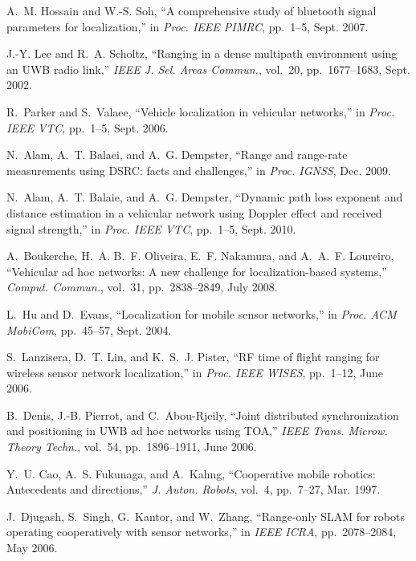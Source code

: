 \documentclass[12pt,journal,final,onecolumn]{IEEEtran}
\theoremstyle{definition}
\theoremstyle{myremark}
\begin{document}
\begin{thebibliography}{10}
A.~M. Hossain and W.-S. Soh, ``A comprehensive study of bluetooth signal
  parameters for localization,'' in {\em Proc. IEEE PIMRC}, pp.~1--5, Sept.
  2007.

J.-Y. Lee and R.~A. Scholtz, ``Ranging in a dense multipath environment using
  an {UWB} radio link,'' {\em IEEE J. Sel. Areas Commun.}, vol.~20,
  pp.~1677--1683, Sept. 2002.

R.~Parker and S.~Valaee, ``Vehicle localization in vehicular networks,'' in
  {\em Proc. IEEE VTC}, pp.~1--5, Sept. 2006.

N.~Alam, A.~T. Balaei, and A.~G. Dempster, ``Range and range-rate measurements
  using {DSRC}: facts and challenges,'' in {\em Proc. IGNSS}, Dec. 2009.

N.~Alam, A.~T. Balaie, and A.~G. Dempster, ``Dynamic path loss exponent and
  distance estimation in a vehicular network using {Doppler} effect and
  received signal strength,'' in {\em Proc. IEEE VTC}, pp.~1--5, Sept. 2010.

A.~Boukerche, H.~A. B.~F. Oliveira, E.~F. Nakamura, and A.~A.~F. Loureiro,
  ``Vehicular ad hoc networks: A new challenge for localization-based
  systems,'' {\em Comput. Commun.}, vol.~31, pp.~2838--2849, July 2008.

L.~Hu and D.~Evans, ``Localization for mobile sensor networks,'' in {\em Proc.
  ACM MobiCom}, pp.~45--57, Sept. 2004.

S.~Lanzisera, D.~T. Lin, and K.~S.~J. Pister, ``{RF} time of flight ranging for
  wireless sensor network localization,'' in {\em Proc. IEEE WISES}, pp.~1--12,
  June 2006.

B.~Denis, J.-B. Pierrot, and C.~Abou-Rjeily, ``Joint distributed
  synchronization and positioning in {UWB} ad hoc networks using {TOA},'' {\em
  IEEE Trans. Microw. Theory Techn.}, vol.~54, pp.~1896--1911, June 2006.

Y.~U. Cao, A.~S. Fukunaga, and A.~Kahng, ``Cooperative mobile robotics:
  Antecedents and directions,'' {\em J. Auton. Robots}, vol.~4, pp.~7--27, Mar.
  1997.

J.~Djugash, S.~Singh, G.~Kantor, and W.~Zhang, ``Range-only {SLAM} for robots
  operating cooperatively with sensor networks,'' in {\em IEEE ICRA},
  pp.~2078--2084, May 2006.


\end{thebibliography}
\end{document}
